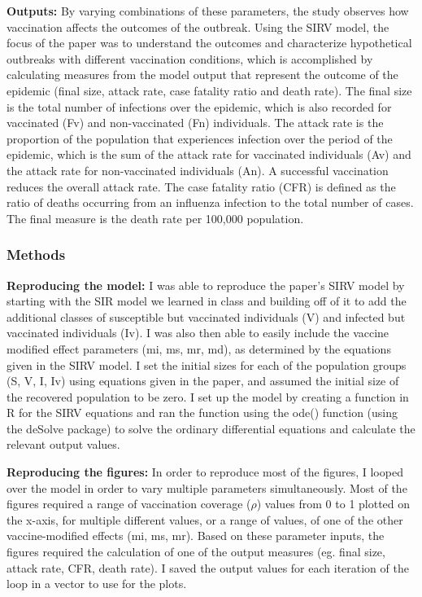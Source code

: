 \documentclass[]{article}
\begin{document}
\textbf{Outputs:} By varying combinations of these parameters, the study
observes how vaccination affects the outcomes of the outbreak. Using the
SIRV model, the focus of the paper was to understand the outcomes and
characterize hypothetical outbreaks with different vaccination
conditions, which is accomplished by calculating measures from the model
output that represent the outcome of the epidemic (final size, attack
rate, case fatality ratio and death rate). The final size is the total
number of infections over the epidemic, which is also recorded for
vaccinated (Fv) and non-vaccinated (Fn) individuals. The attack rate is
the proportion of the population that experiences infection over the
period of the epidemic, which is the sum of the attack rate for
vaccinated individuals (Av) and the attack rate for non-vaccinated
individuals (An). A successful vaccination reduces the overall attack
rate. The case fatality ratio (CFR) is defined as the ratio of deaths
occurring from an influenza infection to the total number of cases. The
final measure is the death rate per 100,000 population.

\hypertarget{methods}{%
\subsubsection{Methods}\label{methods}}

\textbf{Reproducing the model:} I was able to reproduce the paper's SIRV
model by starting with the SIR model we learned in class and building
off of it to add the additional classes of susceptible but vaccinated
individuals (V) and infected but vaccinated individuals (Iv). I was also
then able to easily include the vaccine modified effect parameters (mi,
ms, mr, md), as determined by the equations given in the SIRV model. I
set the initial sizes for each of the population groups (S, V, I, Iv)
using equations given in the paper, and assumed the initial size of the
recovered population to be zero. I set up the model by creating a
function in R for the SIRV equations and ran the function using the
ode() function (using the deSolve package) to solve the ordinary
differential equations and calculate the relevant output values.

\textbf{Reproducing the figures:} In order to reproduce most of the
figures, I looped over the model in order to vary multiple parameters
simultaneously. Most of the figures required a range of vaccination
coverage (\(\rho\)) values from 0 to 1 plotted on the x-axis, for
multiple different values, or a range of values, of one of the other
vaccine-modified effects (mi, ms, mr). Based on these parameter inputs,
the figures required the calculation of one of the output measures (eg.
final size, attack rate, CFR, death rate). I saved the output values for
each iteration of the loop in a vector to use for the plots.
\end{document}
